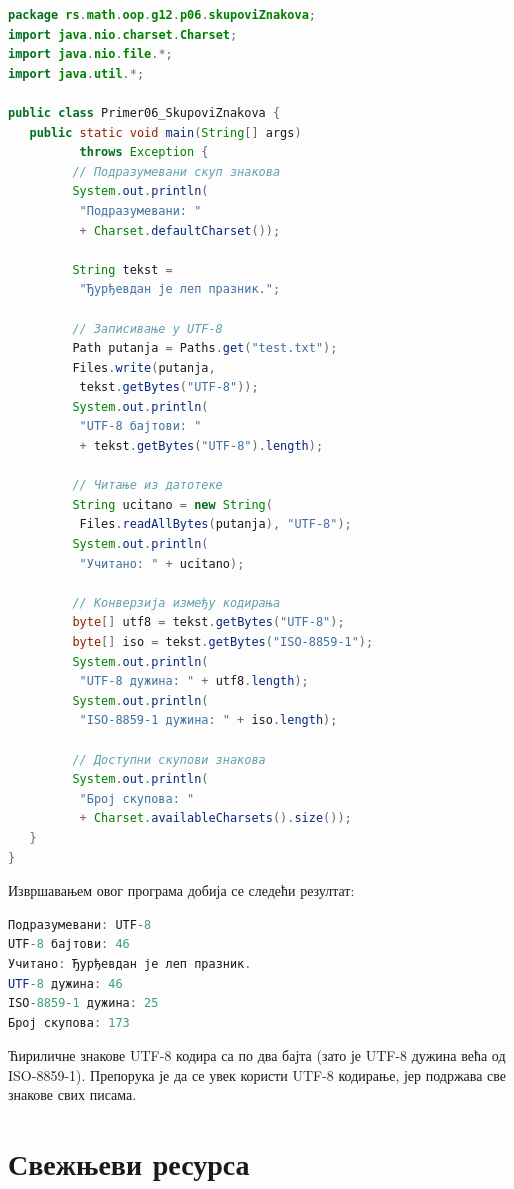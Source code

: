 \begin{lstlisting}[language=Java]
package rs.math.oop.g12.p06.skupoviZnakova;
import java.nio.charset.Charset;
import java.nio.file.*;
import java.util.*;
 
public class Primer06_SkupoviZnakova {
   public static void main(String[] args)
          throws Exception {
         // Подразумевани скуп знакова
         System.out.println(
          "Подразумевани: "
          + Charset.defaultCharset());
 
         String tekst =
          "Ђурђевдан је леп празник.";
 
         // Записивање у UTF-8
         Path putanja = Paths.get("test.txt");
         Files.write(putanja,
          tekst.getBytes("UTF-8"));
         System.out.println(
          "UTF-8 бајтови: "
          + tekst.getBytes("UTF-8").length);
 
         // Читање из датотеке
         String ucitano = new String(
          Files.readAllBytes(putanja), "UTF-8");
         System.out.println(
          "Учитано: " + ucitano);
 
         // Конверзија између кодирања
         byte[] utf8 = tekst.getBytes("UTF-8");
         byte[] iso = tekst.getBytes("ISO-8859-1");
         System.out.println(
          "UTF-8 дужина: " + utf8.length);
         System.out.println(
          "ISO-8859-1 дужина: " + iso.length);
 
         // Доступни скупови знакова
         System.out.println(
          "Број скупова: "
          + Charset.availableCharsets().size());
   }
}
\end{lstlisting}


Извршавањем овог програма добија се следећи резултат:


\begin{lstlisting}[language=Java]
Подразумевани: UTF-8
UTF-8 бајтови: 46
Учитано: Ђурђевдан је леп празник.
UTF-8 дужина: 46
ISO-8859-1 дужина: 25
Број скупова: 173
\end{lstlisting}


Ћириличне знакове UTF-8 кодира са по два бајта (зато је UTF-8 дужина већа од ISO-8859-1). Препорука је да се увек користи UTF-8 кодирање, јер подржава све знакове свих писама.


\section{Свежњеви ресурса}


